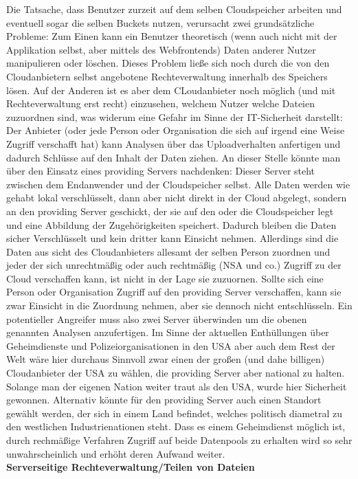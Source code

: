 \documentclass[12pt,a4paper,bibliography=totocnumbered,listof=totocnumbered]{scrartcl}
\begin{document}
Die Tatsache, dass Benutzer zurzeit auf dem selben Cloudspeicher arbeiten und eventuell sogar die selben Buckets nutzen, verursacht zwei grundsätzliche Probleme: Zum Einen kann ein Benutzer theoretisch (wenn auch nicht mit der Applikation selbst, aber mittels des Webfrontends) Daten anderer Nutzer manipulieren oder löschen. Dieses Problem ließe sich noch durch die von den Cloudanbietern selbst angebotene Rechteverwaltung innerhalb des Speichers lösen. Auf der Anderen ist es aber dem CLoudanbieter noch möglich (und mit Rechteverwaltung erst recht) einzusehen, welchem Nutzer welche Dateien zuzuordnen sind, was widerum eine Gefahr im Sinne der IT-Sicherheit darstellt: Der Anbieter (oder jede Person oder Organisation die sich auf irgend eine Weise Zugriff verschafft hat) kann Analysen über das Uploadverhalten anfertigen und dadurch Schlüsse auf den Inhalt der Daten ziehen. An dieser Stelle könnte man über den Einsatz eines providing Servers nachdenken: Dieser Server steht zwischen dem Endanwender und der Cloudspeicher selbst. Alle Daten werden wie gehabt lokal verschlüsselt, dann aber nicht direkt in der Cloud abgelegt, sondern an den providing Server geschickt, der sie auf den oder die Cloudspeicher legt und eine Abbildung der Zugehörigkeiten speichert. Dadurch bleiben die Daten sicher Verschlüsselt und kein dritter kann Einsicht nehmen. Allerdings sind die Daten aus sicht des Cloudanbieters allesamt der selben Person zuordnen und jeder der sich unrechtmäßig oder auch rechtmäßig (NSA und co.) Zugriff zu der Cloud verschaffen kann, ist nicht in der Lage sie zuzuornen. Sollte sich eine Person oder Organisation Zugriff auf den providing Server verschaffen, kann sie zwar Einsicht in die Zuordnung nehmen, aber sie dennoch nicht entschlüsseln. Ein potentieller Angreifer muss also zwei Server überwinden um die obenen genannten Analysen anzufertigen. Im Sinne der aktuellen Enthüllungen über Geheimdienste und Polizeiorganisationen in den USA aber auch dem Rest der Welt wäre hier durchaus Sinnvoll zwar einen der großen (und dahe billigen) Cloudanbieter der USA zu wählen, die providing Server aber national zu halten. Solange man der eigenen Nation weiter traut als den USA, wurde hier Sicherheit gewonnen. Alternativ könnte für den providing Server auch einen Standort gewählt werden, der sich in einem Land befindet, welches politisch diametral zu den westlichen Industrienationen steht. Dass es einem Geheimdienst möglich ist, durch rechmäßige Verfahren Zugriff auf beide Datenpools zu erhalten wird so sehr unwahrscheinlich und erhöht deren Aufwand weiter.
\\\textbf{Serverseitige Rechteverwaltung/Teilen von Dateien}\\
\end{document}
